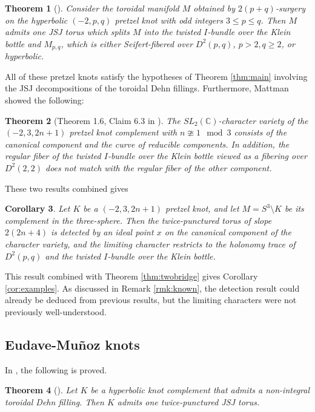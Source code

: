 \documentclass{article}
\theoremstyle{plain}
\newtheorem{theorem}{Theorem}[section]
\theoremstyle{definition}
\theoremstyle{plain}
\theoremstyle{plain}
\newtheorem{corollary}[theorem]{Corollary}
\theoremstyle{plain}
\theoremstyle{remark}
\theoremstyle{remark}
\theoremstyle{plain}
\theoremstyle{plain}
\begin{document}
\begin{theorem}[\cite{IchiharaJongKabaya}]
Consider the toroidal manifold $M$ obtained by $2(p+q)$-surgery on the hyperbolic $(-2, p, q)$ pretzel knot with odd integers $3 \leq p \leq q$. Then $M$ admits one JSJ torus which splits $M$ into the twisted $I$-bundle over the Klein bottle and $M_{p, q}$, which is either Seifert-fibered over $D^2(p, q)$, $p > 2, q \geq 2$, or hyperbolic. 
\end{theorem}

All of these pretzel knots satisfy the hypotheses of Theorem \ref{thm:main} involving the JSJ decompositions of the toroidal Dehn fillings. Furthermore, Mattman \cite{Mattman} showed the following:

\begin{theorem}[Theorem 1.6, Claim 6.3 in \cite{Mattman}]
The $SL_2(\mathbb{C})$-character variety of the $(-2, 3, 2n+1)$ pretzel knot complement with $n \ncong 1 \mod 3$ consists of the canonical component and the curve of reducible components. In addition, the regular fiber of the twisted $I$-bundle over the Klein bottle viewed as a fibering over $D^2(2, 2)$ does not match with the regular fiber of the other component.
\end{theorem}

These two results combined gives 

\begin{corollary}
Let $K$ be a $(-2, 3, 2n+1)$ pretzel knot, and let $M = S^3 \setminus K$ be its complement in the three-sphere. Then the twice-punctured torus of slope $2(2n+4)$ is detected by an ideal point $x$ on the canonical component of the character variety, and the limiting character restricts to the holonomy trace of $D^2(p, q)$ and the twisted $I$-bundle over the Klein bottle. 
\end{corollary}

This result combined with Theorem \ref{thm:twobridge} gives Corollary \ref{cor:examples}. As discussed in Remark \ref{rmk:known}, the detection result could already be deduced from previous results, but the limiting characters were not previously well-understood. 

\subsection{Eudave-Muñoz knots}

In \cite{Gordon2000DehnSO}, the following is proved.

\begin{theorem}[\cite{Gordon2000DehnSO}]
Let $K$ be a hyperbolic knot complement that admits a non-integral toroidal Dehn filling. Then $K$ admits one twice-punctured JSJ torus. 
\end{theorem}
\end{document}
